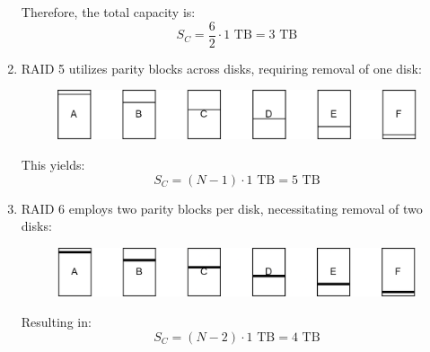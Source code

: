 \begin{enumerate}
\begin{figure}[H]
        \end{figure}
        Therefore, the total capacity is:
        \[S_C=\dfrac{6}{2}\cdot 1\text{ TB}=3\text{ TB}\]
    \item RAID 5 utilizes parity blocks across disks, requiring removal of one disk:
        \begin{figure}[H]
            \centering
            \includegraphics[width=0.7\linewidth]{images/raid5.png}
        \end{figure}
        This yields:
        \[S_C=(N-1)\cdot 1\text{ TB}=5\text{ TB}\]
    \item RAID 6 employs two parity blocks per disk, necessitating removal of two disks:
    \begin{figure}[H]
        \centering
        \includegraphics[width=0.7\linewidth]{images/raid6.png}
    \end{figure}
    Resulting in:
    \[S_C=(N-2)\cdot 1\text{ TB}=4\text{ TB}\]
\end{enumerate}
